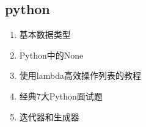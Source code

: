 \documentclass[letterpaper,10pt,english]{sphinxmanual}
\begin{document}
\subsection{python}
\label{\detokenize{else/01_interview:python}}\begin{enumerate}
\item {} 
基本数据类型

\end{enumerate}
\begin{quote}

\end{quote}
\begin{enumerate}
\setcounter{enumi}{1}
\item {} 
Python中的None

\end{enumerate}
\begin{quote}

\end{quote}
\begin{enumerate}
\setcounter{enumi}{2}
\item {} 
使用lambda高效操作列表的教程

\end{enumerate}
\begin{quote}

\end{quote}
\begin{enumerate}
\setcounter{enumi}{3}
\item {} 
经典7大Python面试题

\end{enumerate}
\begin{quote}

\end{quote}
\begin{enumerate}
\setcounter{enumi}{4}
\item {} 
迭代器和生成器

\end{enumerate}
\begin{quote}

\end{quote}
\end{document}
